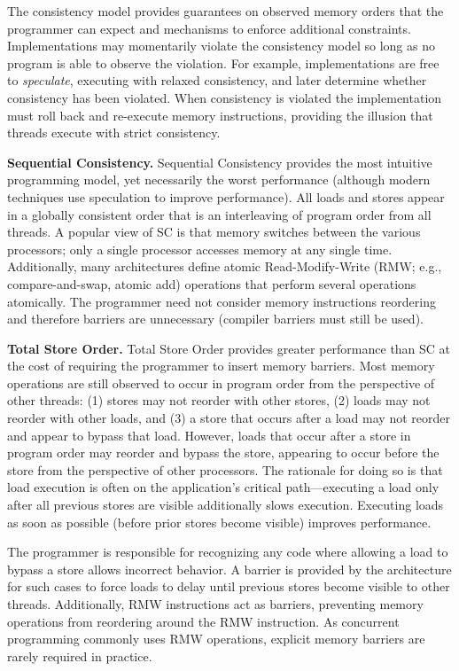 The consistency model provides guarantees on observed memory orders that the programmer can expect and mechanisms to enforce additional constraints.
Implementations may momentarily violate the consistency model so long as no program is able to observe the violation.
For example, implementations are free to \emph{speculate}, executing with relaxed consistency, and later determine whether consistency has been violated.
When consistency is violated the implementation must roll back and re-execute memory instructions, providing the illusion that threads execute with strict consistency.

\textbf{Sequential Consistency.}
Sequential Consistency \cite{Lamport79} provides the most intuitive programming model, yet necessarily the worst performance (although modern techniques use speculation to improve performance).
All loads and stores appear in a globally consistent order that is an interleaving of program order from all threads.
A popular view of SC is that memory switches between the various processors; only a single processor accesses memory at any single time.
Additionally, many architectures define atomic Read-Modify-Write (RMW; e.g., compare-and-swap, atomic add) operations that perform several operations atomically.
The programmer need not consider memory instructions reordering and therefore barriers are unnecessary (compiler barriers must still be used).

\textbf{Total Store Order.}
Total Store Order \cite{SPARCv9} provides greater performance than SC at the cost of requiring the programmer to insert memory barriers.
Most memory operations are still observed to occur in program order from the perspective of other threads: (1) stores may not reorder with other stores, (2) loads may not reorder with other loads, and (3) a store that occurs after a load may not reorder and appear to bypass that load.
However, loads that occur after a store in program order may reorder and bypass the store, appearing to occur before the store from the perspective of other processors.
The rationale for doing so is that load execution is often on the application's critical path---executing a load only after all previous stores are visible additionally slows execution.
Executing loads as soon as possible (before prior stores become visible) improves performance.

The programmer is responsible for recognizing any code where allowing a load to bypass a store allows incorrect behavior.
A barrier is provided by the architecture for such cases to force loads to delay until previous stores become visible to other threads.
Additionally, RMW instructions act as barriers, preventing memory operations from reordering around the RMW instruction.
As concurrent programming commonly uses RMW operations, explicit memory barriers are rarely required in practice.

